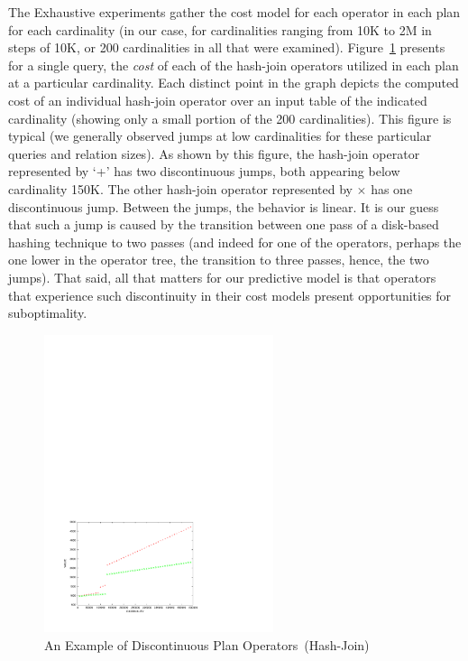 \documentclass[prodmode,acmtods]{acmsmall}
\begin{document}
{The Exhaustive experiments gather the cost model for each operator in each
plan for each cardinality (in our case, for cardinalities ranging from 10K
to 2M in steps of 10K, or 200 cardinalities in all that were examined).  Figure~\ref{fig:discontinuity}
presents for a single query, the {\em cost} of each of the hash-join operators utilized in
each plan at a particular cardinality. Each distinct point in the graph
depicts the computed cost of an individual hash-join operator over an input
table of the indicated cardinality (showing only a small portion of the 200
cardinalities).  This figure is typical
(we generally observed jumps at low cardinalities for these particular queries and
relation sizes).  As shown by this figure, the hash-join operator
represented by `+' has two discontinuous jumps, both appearing below
cardinality 150K. The other hash-join operator represented by $\times$ has one
discontinuous jump.  Between the jumps, the behavior is linear. It is our
guess that
such a jump is caused by the transition between one pass of a disk-based hashing
technique to two passes (and indeed for one of the operators, perhaps the one
lower in the operator tree, the transition to three passes, hence, the two
jumps). That said, all
that matters for our predictive model is that operators that experience
such discontinuity in their cost models present opportunities for
suboptimality.

\begin{figure}[t]
\centering
\includegraphics[width=0.60\textwidth]{figures/discontinuity_500K.pdf}%
\caption{An Example of Discontinuous Plan \hbox{Operators (Hash-Join)}}
\label{fig:discontinuity}
\end{figure}

}
\end{document}
